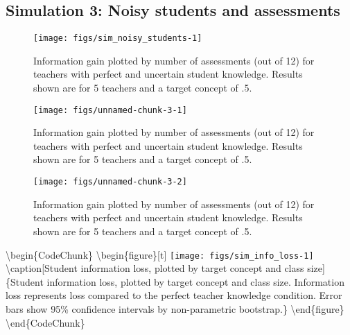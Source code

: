 \documentclass[10pt, letterpaper]{article}
\newenvironment{CodeChunk}{}{}
\begin{document}
\subsection{Simulation 3: Noisy students and
assessments}\label{simulation-3-noisy-students-and-assessments}

\begin{CodeChunk}
\begin{figure*}[t]
\texttt{[image: figs/sim\_noisy\_students-1]} \caption[Information gain plotted by number of assessments (out of 12) for teachers with perfect and uncertain student knowledge]{Information gain plotted by number of assessments (out of 12) for teachers with perfect and uncertain student knowledge. Results shown are for 5 teachers and a target concept of .5.}\label{fig:sim_noisy_students}
\end{figure*}
\end{CodeChunk}

\begin{CodeChunk}
\begin{figure}[t]
\texttt{[image: figs/unnamed-chunk-3-1]} \caption[Information gain plotted by number of assessments (out of 12) for teachers with perfect and uncertain student knowledge]{Information gain plotted by number of assessments (out of 12) for teachers with perfect and uncertain student knowledge. Results shown are for 5 teachers and a target concept of .5.}\label{fig:unnamed-chunk-31}
\end{figure}
\begin{figure}[t]
\texttt{[image: figs/unnamed-chunk-3-2]} \caption[Information gain plotted by number of assessments (out of 12) for teachers with perfect and uncertain student knowledge]{Information gain plotted by number of assessments (out of 12) for teachers with perfect and uncertain student knowledge. Results shown are for 5 teachers and a target concept of .5.}\label{fig:unnamed-chunk-32}
\end{figure}
\end{CodeChunk}

\textbackslash{}begin\{CodeChunk\}
\textbackslash{}begin\{figure\}{[}t{]}
\texttt{[image: figs/sim\_info\_loss-1]}
\textbackslash{}caption{[}Student information loss, plotted by target
concept and class size{]}\{Student information loss, plotted by target
concept and class size. Information loss represents loss compared to the
perfect teacher knowledge condition. Error bars show 95\% confidence
intervals by non-parametric bootstrap.\}\label{fig:sim_info_loss}
\textbackslash{}end\{figure\} \textbackslash{}end\{CodeChunk\}
\end{document}
